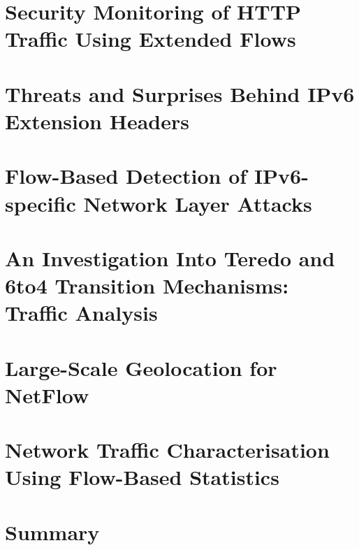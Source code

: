 \newpage

\section{Security Monitoring of HTTP Traffic Using Extended Flows}\label{sec:analysis-http-flows}

\section{Threats and Surprises Behind IPv6 Extension Headers}\label{sec:analysis-ipv6-threats}

\section{Flow-Based Detection of IPv6-specific Network Layer Attacks}\label{sec:analysis-ipv6-attacks}

\section{An Investigation Into Teredo and 6to4 Transition Mechanisms: Traffic Analysis}\label{sec:analysis-ipv6-transition}

\section{Large-Scale Geolocation for NetFlow}\label{sec:analysis-geolocation}

\section{Network Traffic Characterisation Using Flow-Based Statistics}\label{sec:analysis-characterisation}


\section{Summary}\label{sec:use-cases-summary}